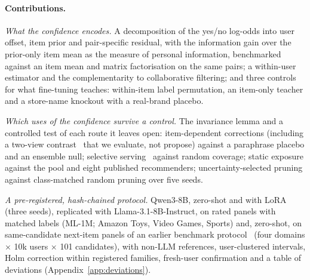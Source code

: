 \paragraph{Contributions.}
\begin{list}{}{\introlistsetup}
\item[C1] \emph{What the confidence encodes.} A decomposition of the yes/no log-odds into user offset, item prior and pair-specific
  residual, with the information gain over the prior-only item mean as the measure of personal information, benchmarked against an
  item mean and matrix factorisation on the same pairs; a within-user estimator and the complementarity to collaborative filtering;
  and three controls for what fine-tuning teaches: within-item label permutation, an item-only teacher and a store-name knockout
  with a real-brand placebo.
\item[C2] \emph{Which uses of the confidence survive a control.} The invariance lemma and a controlled test of each route it
  leaves open: item-dependent corrections (including a two-view contrast~\citep{burns2023ccs} that we evaluate, not propose)
  against a paraphrase placebo and an ensemble null; selective serving~\citep{geifman2017selective} against random coverage;
  static exposure against the pool and eight published recommenders; uncertainty-selected pruning against class-matched random
  pruning over five seeds.
\item[C3] \emph{A pre-registered, hash-chained protocol.} Qwen3-8B, zero-shot and with LoRA (three seeds), replicated with
  Llama-3.1-8B-Instruct, on rated panels with matched labels (ML-1M; Amazon Toys, Video Games, Sports) and, zero-shot, on
  same-candidate next-item panels of an earlier benchmark protocol~\citep{anon2026benchmark} (four domains $\times$ 10k users
  $\times$ 101 candidates), with non-LLM references, user-clustered intervals, Holm correction within registered families, fresh-user
  confirmation and a table of deviations (Appendix~\ref{app:deviations}).
\end{list}


